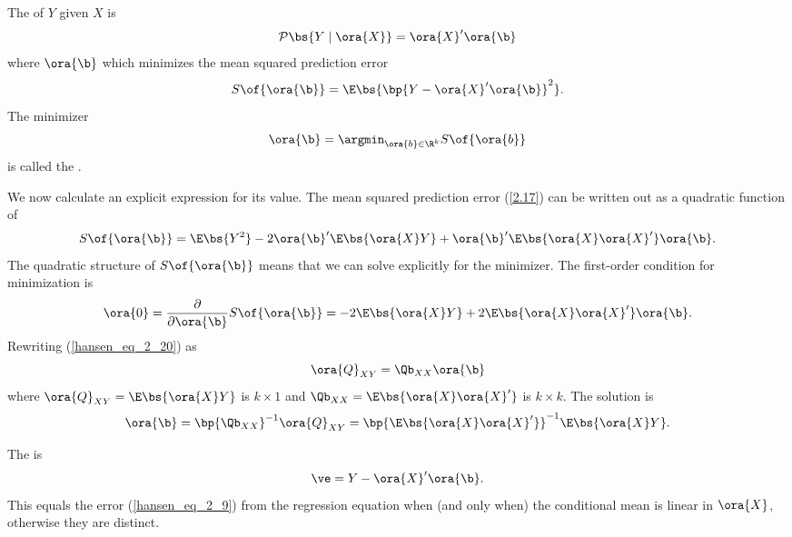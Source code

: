 \begin{definition}
    The  of $Y$ given $X$ is 
    \begin{equation}
        \notag
        \mathcal{P}\bs{Y \mid \ora{X}} = \ora{X}^\prime \ora{\b}
    \end{equation}
    where $\ora{\b}$ which minimizes the mean squared prediction error 
    $$S\of{\ora{\b}} = \E\bs{\bp{Y - \ora{X}^\prime \ora{\b}}^2}.$$
    The minimizer 
    \begin{equation}
        \label{hansen_eq_2_18}
        \ora{\b} = \argmin_{\ora{b} \in \R^k} S\of{\ora{b}}
    \end{equation}
    is called the .
\end{definition}

We now calculate an explicit expression for its value. The mean squared prediction error (\ref{2.17}) can be written out as a quadratic function of
\begin{equation}
    \label{hansen_eq_2_19}
    S\of{\ora{\b}} = \E\bs{Y^2} - 2 \ora{\b}^\prime \E\bs{\ora{X}Y} + \ora{\b}^\prime \E\bs{\ora{X}\ora{X}^\prime} \ora{\b}.
\end{equation}
The quadratic structure of $S\of{\ora{\b}}$ means that we can solve explicitly for the minimizer. The first-order condition for minimization is 
\begin{equation}
    \label{hansen_eq_2_20}
    \ora{0} = \frac{\partial}{\partial \ora{\b}} S\of{\ora{\b}} = -2 \E\bs{\ora{X}Y} + 2 \E\bs{\ora{X}\ora{X}^\prime} \ora{\b}.
\end{equation}
Rewriting (\ref{hansen_eq_2_20}) as 
\begin{equation}
    \label{hansen_eq_2_21}
    \ora{Q}_{XY} = \Qb_{XX} \ora{\b}
\end{equation}
where $\ora{Q}_{XY} = \E\bs{\ora{X}Y}$ is $k \times 1$ and $\Qb_{XX} = \E\bs{\ora{X}\ora{X}^\prime}$ is $k \times k$. The solution is 
\begin{equation}
    \label{hansen_eq_2_22}
    \ora{\b} = \bp{\Qb_{XX}}^{-1} \ora{Q}_{XY} = \bp{\E\bs{\ora{X}\ora{X}^\prime}}^{-1} \E\bs{\ora{X}Y}.
\end{equation}

The  is
\begin{equation}
    \label{hansen_eq_2_23}
    \ve = Y - \ora{X}^\prime \ora{\b}.
\end{equation}
This equals the error (\ref{hansen_eq_2_9}) from the regression equation when (and only when) the conditional mean is linear in $\ora{X}$, otherwise they are distinct.


